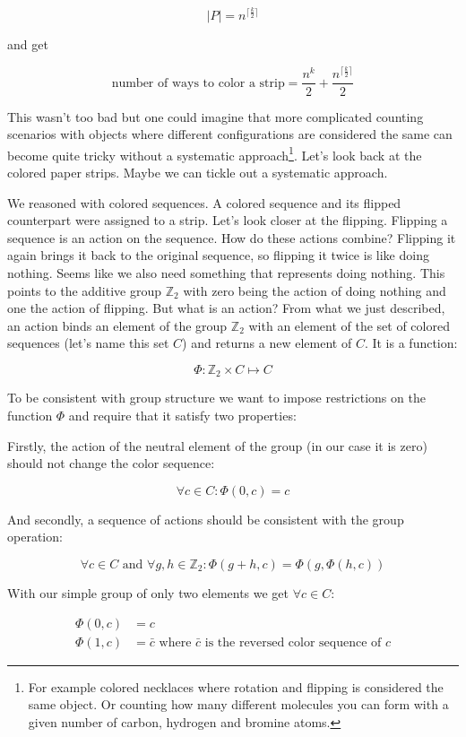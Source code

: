 $$
|P| = n^{\lceil \frac{k}{2} \rceil}
$$

and get

$$
\text{number of ways to color a strip} = \frac{n^k}{2} + \frac{n^{\lceil \frac{k}{2} \rceil}}{2}
$$

This wasn't too bad but one could imagine that more complicated counting scenarios with objects where different configurations are considered the same can become quite tricky without a systematic approach\footnote{For example colored necklaces where rotation and flipping is considered the same object. Or counting how many different molecules you can form with a given number of carbon, hydrogen and bromine atoms.}. Let's look back at the colored paper strips. Maybe we can tickle out a systematic approach.

We reasoned with colored sequences. A colored sequence and its flipped counterpart were assigned to a strip. Let's look closer at the flipping. Flipping a sequence is an action on the sequence. How do these actions combine? Flipping it again brings it back to the original sequence, so flipping it twice is like doing nothing. Seems like we also need something that represents doing nothing. This points to the additive group $\mathbb{Z}_2$ with zero being the action of doing nothing and one the action of flipping. But what is an action? From what we just described, an action binds an element of the group $\mathbb{Z}_2$ with an element of the set of colored sequences (let's name this set $C$) and returns a new element of $C$. It is a function:

$$
\Phi: \mathbb{Z}_2 \times C \mapsto C
$$

To be consistent with group structure we want to impose restrictions on the function $\Phi$ and require that it satisfy two properties: 

Firstly, the action of the neutral element of the group (in our case it is zero) should not change the color sequence: 

$$
\forall c \in C: \Phi(0, c) = c
$$

And secondly, a sequence of actions should be consistent with the group operation:

$$
\forall c \in C \text{ and } \forall g, h \in \mathbb{Z}_2: \Phi(g + h, c) = \Phi(g, \Phi(h, c))
$$

With our simple group of only two elements we get $\forall c \in C$:

\begin{align*}
\Phi(0, c) &= c \\
\Phi(1, c) &= \bar{c} \text{ where } \bar{c} \text{ is the reversed color sequence of } c
\end{align*}

